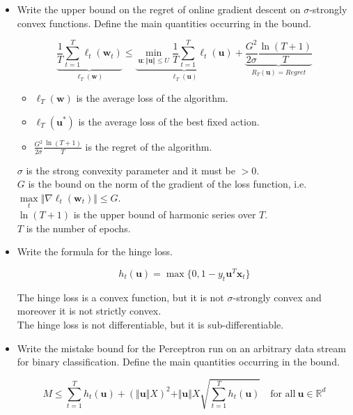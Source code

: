 \begin{itemize}
    \item Write the upper bound on the regret of online gradient descent on $\sigma$-strongly convex functions. Define the main quantities occurring in the bound.

        $$
        \underbrace{\frac{1}{T} \sum_{t=1}^{T} \ell_{t}(\boldsymbol{w}_{t})}_{\ell_T(\boldsymbol{w})} \leq \underbrace{\min_{\boldsymbol{u} : \Vert \boldsymbol{u} \Vert \leq U} \frac{1}{T} \sum_{t=1}^{T} \ell_{t}(\boldsymbol{u})}_{\ell_T(\boldsymbol{u})} + \underbrace{\frac{G^2}{2\sigma} \frac{\ln({T + 1})}{T}}_{R_T(\boldsymbol{u}) = Regret}
        $$

        \begin{itemize}
            \item $\ell_T(\boldsymbol{w})$ is the average loss of the algorithm.
            \item $\ell_T(\boldsymbol{u^*})$ is the average loss of the best fixed action.
            \item $\frac{G^2}{2\sigma} \frac{\ln({T + 1})}{T}$ is the regret of the algorithm.
        \end{itemize}
       
        $\sigma$ is the strong convexity parameter and it must be $> 0$.\\
        $G$ is the bound on the norm of the gradient of the loss function, i.e. $\underset{t}{\max} \Vert \nabla \ell_{t}(\boldsymbol{w}_{t}) \Vert \leq G$.\\
        $\ln(T + 1)$ is the upper bound of harmonic series over $T$.\\
        $T$ is the number of epochs.


        \item Write the formula for the hinge loss.

        $$
        h_{t}(\boldsymbol{u}) = \max\{0, 1 - y_{t} \boldsymbol{u}^T \boldsymbol{x}_{t}\}
        $$

        The hinge loss is a convex function, but it is not $\sigma$-strongly convex and moreover it is not strictly convex.\\
        The hinge loss is not differentiable, but it is sub-differentiable.\\

        \item Write the mistake bound for the Perceptron run on an arbitrary data stream for binary classification. Define the main quantities occurring in the bound.
        
            $$
            M \leq \sum_{t=1}^{T} h_{t}(\boldsymbol{u}) + (\Vert \boldsymbol{u} \Vert X)^2 + \Vert \boldsymbol{u} \Vert X \sqrt{\sum_{t=1}^{T}h_t (\boldsymbol{u})} \quad \text{for all}\ \boldsymbol{u} \in \mathbb{R}^d    
            $$
            

\end{itemize}
